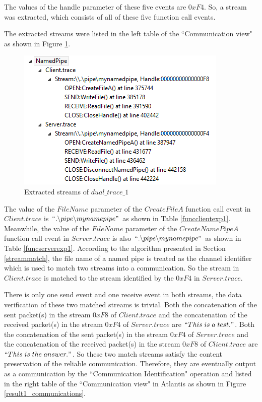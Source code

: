 The values of the handle parameter of these five events are $0xF4$. So, a stream was extracted, which consists of all of these five function call events. 

The extracted streams were listed in the left table of the ``Communication view"  as shown in Figure \ref{result1_streams}.

\begin{figure}[H]
\centerline{\includegraphics{Figures/result1_streams}}
 \caption{Extracted streams of $dual\_trace\_1$}
\label{result1_streams}
\end{figure}

The value of the $FileName$ parameter of the $CreateFileA$ function call event in $Client.trace$ is $``.\backslash pipe \backslash mynamepipe"$ as shown in Table \ref{funcclientexp1}. Meanwhile, the value of the $FileName$ parameter of the $CreateNamePipeA$ function call event in $Server.trace$ is also $``.\backslash pipe \backslash mynamepipe"$ as shown in Table \ref{funcserverexp1}. According to the algorithm presented in Section \ref{streammatch}, the file name of a named pipe is treated as the channel identifier which is used to match two streams into a communication. So the stream in $Client.trace$ is matched to the stream identified by the $0xF4$ in $Server.trace$.

There is only one send event and one receive event in both streams, the data verification of these two matched streams is trivial. Both the concatenation of the sent packet(s) in the stream $0xF8$ of $Client.trace$ and the concatenation of the received packet(s) in the stream $0xF4$ of $Server.trace$ are $``This\; is\; a\; test."$. Both the concatenation of the sent packet(s) in the stream $0xF4$ of $Server.trace$ and the concatenation of the received packet(s) in the stream $0xF8$ of $Client.trace$ are $``This\; is\; the\; answer."$. So these two match streams satisfy the content preservation of the reliable communication. Therefore, they are eventually output as a communication by the ``Communication Identification" operation and listed in the right table of the ``Communication view" in Atlantis as shown in Figure \ref{result1_communications}.


